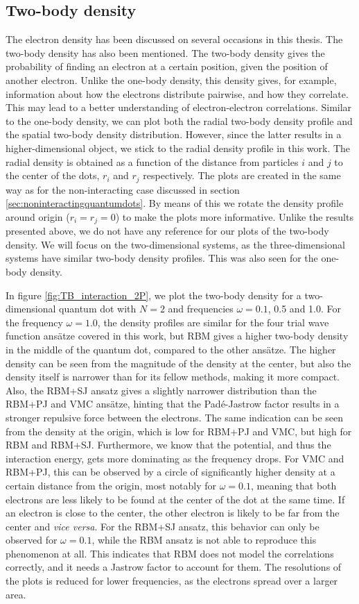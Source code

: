 \subsection{Two-body density}
The electron density has been discussed on several occasions in this thesis. The two-body density has also been mentioned. The two-body density gives the probability of finding an electron at a certain position, given the position of another electron. Unlike the one-body density, this density gives, for example, information about how the electrons distribute pairwise, and how they correlate. This may lead to a better understanding of electron-electron correlations. Similar to the one-body density, we can plot both the radial two-body density profile and the spatial two-body density distribution. However, since the latter results in a higher-dimensional object, we stick to the radial density profile in this work. The radial density is obtained as a function of the distance from particles $i$ and $j$ to the center of the dots, $r_i$ and $r_j$ respectively. The plots are created in the same way as for the non-interacting case discussed in section \ref{sec:noninteractingquantumdots}. By means of this we rotate the density profile around origin ($r_i=r_j=0$) to make the plots more informative. Unlike the results presented above, we do not have any reference for our plots of the two-body density. We will focus on the two-dimensional systems, as the three-dimensional systems have similar two-body density profiles. This was also seen for the one-body density.

In figure \eqref{fig:TB_interaction_2P}, we plot the two-body density for a two-dimensional quantum dot with $N=2$ and frequencies $\omega=0.1$, 0.5 and 1.0. For the frequency $\omega=1.0$, the density profiles are similar for the four trial wave function ansätze covered in this work, but RBM gives a higher two-body density in the middle of the quantum dot, compared to the other ansätze. The higher density can be seen from the magnitude of the density at the center, but also the density itself is narrower than for its fellow methods, making it more compact. Also, the RBM+SJ ansatz gives a slightly narrower distribution than the RBM+PJ and VMC ansätze, hinting that the Padé-Jastrow factor results in a stronger repulsive force between the electrons. The same indication can be seen from the density at the origin, which is low for RBM+PJ and VMC, but high for RBM and RBM+SJ. Furthermore, we know that the potential, and thus the interaction energy, gets more dominating as the frequency drops. For VMC and RBM+PJ, this can be observed by a circle of significantly higher density at a certain distance from the origin, most notably for $\omega=0.1$, meaning that both electrons are less likely to be found at the center of the dot at the same time. If an electron is close to the center, the other electron is likely to be far from the center and \textit{vice versa}. For the RBM+SJ ansatz, this behavior can only be observed for $\omega=0.1$, while the RBM ansatz is not able to reproduce this phenomenon at all. This indicates that RBM does not model the correlations correctly, and it needs a Jastrow factor to account for them. The resolutions of the plots is reduced for lower frequencies, as the electrons spread over a larger area.

